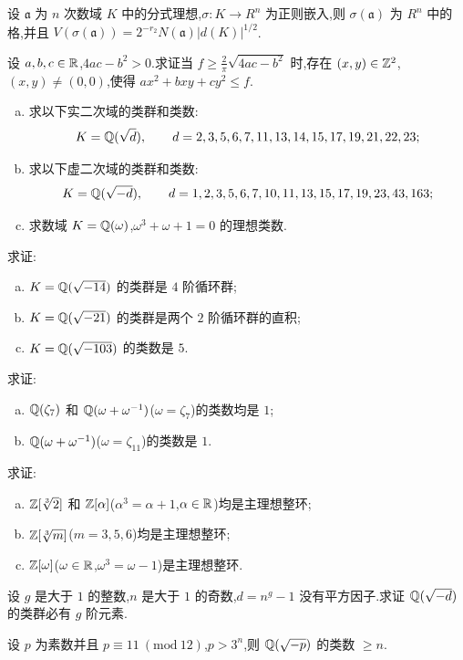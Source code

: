 \begin{Exercises}
\begin{enumerate}[(a)]
  \end{enumerate}
  \item 设 $\mathfrak{a}$ 为 $n$ 次数域 $K$ 中的分式理想,$\sigma\colon K\to R^n$ 为正则嵌入,则 $\sigma(\mathfrak{a})$ 为 $R^n$ 中的格,并且 $V(\sigma(\mathfrak{a}))=2^{-r_2}N(\mathfrak{a})|d(K)|^{1/2}$.
  \item 设 $a,b,c\in\mathbb{R}$,$4ac-b^2>0$.求证当 $f\geqslant\frac{2}{\pi}\sqrt{4ac-b^2}$ 时,存在 $(x,y)\in\mathbb{Z}^2$,$(x,y)\neq(0,0)$,使得 $ax^2+bxy+cy^2\leqslant f$.
  \item \begin{enumerate}[(a)]
    \item 求以下实二次域的类群和类数:
    \[
      K=\mathbb{Q}(\sqrt{d}),\qquad d=2,3,5,6,7,11,13,14,15,17,19,21,22,23;
    \]
    \item 求以下虚二次域的类群和类数:
    \[
      K=\mathbb{Q}(\sqrt{-d}),\qquad d=1,2,3,5,6,7,10,11,13,15,17,19,23,43,163;
    \]
    \item 求数域 $K=\mathbb{Q}(\omega)$,$\omega^3+\omega+1=0$ 的理想类数.
  \end{enumerate}
  \item 求证:
  \begin{enumerate}[(a)]
    \item $K=\mathbb{Q}(\sqrt{-14})$ 的类群是 $4$ 阶循环群;
    \item $K=\mathbb{Q}(\sqrt{-21})$ 的类群是两个 $2$ 阶循环群的直积;
    \item $K=\mathbb{Q}(\sqrt{-103})$ 的类数是 $5$.
  \end{enumerate}
  \item 求证:
  \begin{enumerate}[(a)]
    \item $\mathbb{Q}(\zeta_7)$ 和 $\mathbb{Q}(\omega+\omega^{-1})$($\omega=\zeta_7$)的类数均是 $1$;
    \item $\mathbb{Q}(\omega+\omega^{-1})$($\omega=\zeta_{11}$)的类数是 $1$.
  \end{enumerate}
  \item 求证:
  \begin{enumerate}[(a)]
    \item $\mathbb{Z}[\sqrt[3]{2}]$ 和 $\mathbb{Z}[\alpha]$($\alpha^3=\alpha+1$,$\alpha\in\mathbb{R}$)均是主理想整环;
    \item $\mathbb{Z}[\sqrt[3]{m}]$($m=3,5,6$)均是主理想整环;
    \item $\mathbb{Z}[\omega]$($\omega\in\mathbb{R}$,$\omega^3=\omega-1$)是主理想整环.
  \end{enumerate}
  \item 设 $g$ 是大于 $1$ 的整数,$n$ 是大于 $1$ 的奇数,$d=n^g-1$ 没有平方因子.求证 $\mathbb{Q}(\sqrt{-d})$ 的类群必有 $g$ 阶元素.
  \item 设 $p$ 为素数并且 $p\equiv 11\ (\mathrm{mod}\ 12)$,$p>3^n$,则 $\mathbb{Q}(\sqrt{-p})$ 的类数 $\geqslant n$.
\end{Exercises}
